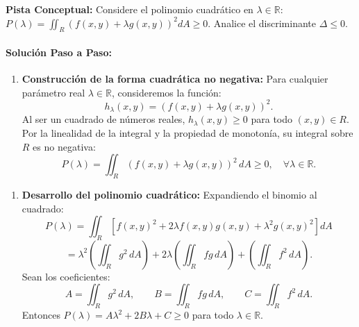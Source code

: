 \documentclass[11pt,a4paper]{article}
\begin{document}
\begin{tcolorbox}[colback=yellow!4,colframe=accentamber!70,arc=1mm,boxrule=0.5pt,left=3mm,right=3mm,top=1.5mm,bottom=1.5mm]
\textbf{Pista Conceptual:} Considere el polinomio cuadrático en $\lambda \in \mathbb{R}$: $P(\lambda) = \iint_R (f(x,y) + \lambda g(x,y))^2 dA \ge 0$. Analice el discriminante $\Delta \le 0$.
\end{tcolorbox}

\paragraph{Solución Paso a Paso:}\par
\begin{enumerate}[label=\textbf{\arabic*.}]
\item \textbf{Construcción de la forma cuadrática no negativa:}
Para cualquier parámetro real $\lambda \in \mathbb{R}$, consideremos la función:
\begin{equation*}
h_\lambda(x,y) = (f(x,y) + \lambda g(x,y))^2.
\end{equation*}
Al ser un cuadrado de números reales, $h_\lambda(x,y) \ge 0$ para todo $(x,y) \in R$.
Por la linealidad de la integral y la propiedad de monotonía, su integral sobre $R$ es no negativa:
\begin{equation*}
P(\lambda) = \iint_R (f(x,y) + \lambda g(x,y))^2 \, dA \ge 0, \quad \forall \lambda \in \mathbb{R}.
\end{equation*}
\end{enumerate}

\begin{enumerate}[label=\textbf{\arabic*.}]
\item \textbf{Desarrollo del polinomio cuadrático:}
Expandiendo el binomio al cuadrado:
\begin{equation*}
P(\lambda) = \iint_R \left[ f(x,y)^2 + 2\lambda f(x,y)g(x,y) + \lambda^2 g(x,y)^2 \right] dA
\end{equation*}
\begin{equation*}
= \lambda^2 \left(\iint_R g^2 \, dA\right) + 2\lambda \left(\iint_R fg \, dA\right) + \left(\iint_R f^2 \, dA\right).
\end{equation*}
Sean los coeficientes:
\begin{equation*}
A = \iint_R g^2 \, dA, \qquad B = \iint_R fg \, dA, \qquad C = \iint_R f^2 \, dA.
\end{equation*}
Entonces $P(\lambda) = A \lambda^2 + 2B \lambda + C \ge 0$ para todo $\lambda \in \mathbb{R}$.
\end{enumerate}
\end{document}
